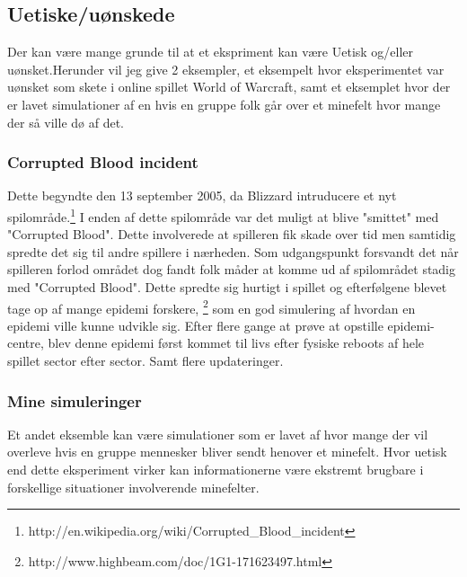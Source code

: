 \subsection{Uetiske/uønskede}
Der kan være mange grunde til at et ekspriment kan være Uetisk og/eller
uønsket.Herunder vil jeg give 2 eksempler, et eksempelt hvor eksperimentet var
uønsket som skete i online spillet World of Warcraft, samt et eksemplet hvor
der er lavet simulationer af en hvis en gruppe folk går over et minefelt hvor
mange der så ville dø af det.

\subsubsection{Corrupted Blood incident}
Dette begyndte den 13 september 2005, da Blizzard intruducere et nyt
spilområde.\footnote{http://en.wikipedia.org/wiki/Corrupted\_Blood\_incident}
I enden af dette spilområde var det muligt at blive "smittet" med "Corrupted
Blood". Dette involverede at spilleren fik skade over tid men samtidig
spredte det sig til andre spillere i nærheden. Som udgangspunkt forsvandt
det når spilleren forlod området dog fandt folk måder at komme ud af
spilområdet stadig med "Corrupted Blood". Dette spredte sig hurtigt
i spillet og efterfølgene blevet tage op af mange epidemi forskere,
\footnote{http://www.highbeam.com/doc/1G1-171623497.html} som en god simulering
af hvordan en epidemi ville kunne udvikle sig. Efter flere gange at prøve at
opstille epidemi-centre, blev denne epidemi først kommet til livs efter fysiske
reboots af hele spillet sector efter sector. Samt flere updateringer.

\subsubsection{Mine simuleringer}
Et andet eksemble kan være simulationer som er lavet af hvor mange der vil
overleve hvis en gruppe mennesker bliver sendt henover et minefelt. Hvor uetisk
end dette eksperiment virker kan informationerne være ekstremt brugbare i
forskellige situationer involverende minefelter.

